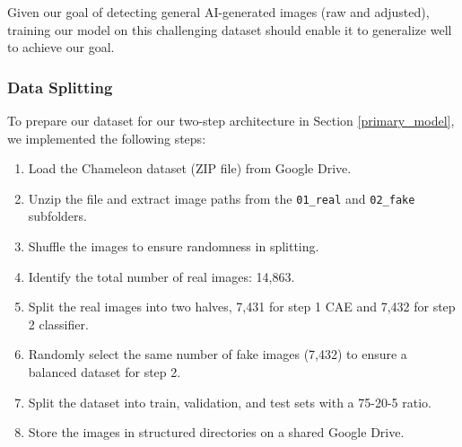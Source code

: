 \documentclass{article} %
\begin{document}

Given our goal of detecting general AI-generated images (raw and adjusted), training our model on this challenging dataset should enable it to generalize well to achieve our goal.

\subsubsection{Data Splitting}

To prepare our dataset for our two-step architecture in Section \ref{primary_model}, we implemented the following steps:
\begin{enumerate}
    \item Load the Chameleon dataset (ZIP file) from Google Drive.
    \item Unzip the file and extract image paths from the \texttt{01\_real} and \texttt{02\_fake} subfolders.
    \item Shuffle the images to ensure randomness in splitting.
    \item Identify the total number of real images: 14,863.
    \item Split the real images into two halves, 7,431 for step 1 CAE and 7,432 for step 2 classifier.
    \item Randomly select the same number of fake images (7,432) to ensure a balanced dataset for step 2.
    \item Split the dataset into train, validation, and test sets with a 75-20-5 ratio.
    \item Store the images in structured directories on a shared Google Drive.
\end{enumerate}
\end{document}
